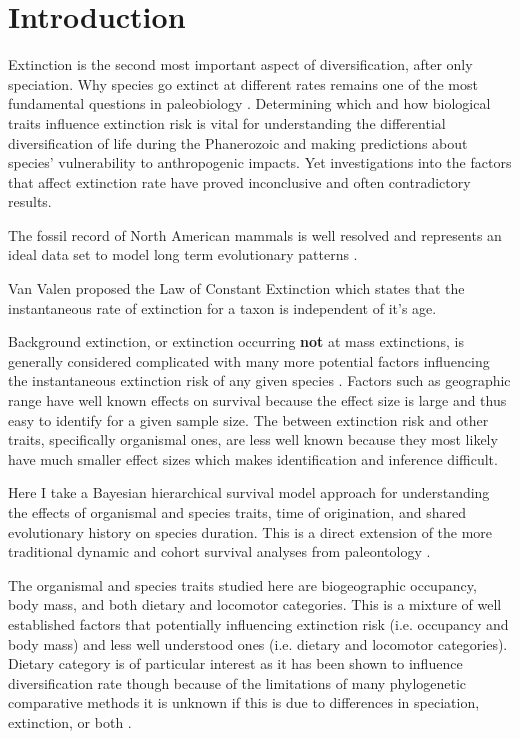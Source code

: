 \documentclass[12pt,letterpaper]{article}
\begin{document}
\section{Introduction}

Extinction is the second most important aspect of diversification, after only speciation. Why species go extinct at different rates remains one of the most fundamental questions in paleobiology \citep{Simpson1944,VanValen1973,Raup1991b,Raup1994,Quental2013,Wagner2014b,Jablonski2005,Payne2007,Kitchell1986}. Determining which and how biological traits influence extinction risk is vital for understanding the differential diversification of life during the Phanerozoic and making predictions about species' vulnerability to anthropogenic impacts. Yet investigations into the factors that affect extinction rate have proved inconclusive and often contradictory results.


The fossil record of North American mammals is well resolved and represents an ideal data set to model long term evolutionary patterns \citep{Quental2013,Alroy2009,Alroy1996a,Alroy1998,Alroy2000g,Simpson1944,Blois2009,Tomiya2013,Marcot2014}.

Van Valen proposed the Law of Constant Extinction \citep{VanValen1973} which states that the instantaneous rate of extinction for a taxon is independent of it's age. 

Background extinction, or extinction occurring \textbf{not} at mass extinctions, is generally considered complicated with many more potential factors influencing the instantaneous extinction risk of any given species \citep{Jablonski1986,Wang2003,Harnik2013,Kitchell1986,Nurnberg2013a,Payne2007}. Factors such as geographic range have well known effects on survival \citep{Payne2007,Jablonski1987} because the effect size is large and thus easy to identify for a given sample size. The between extinction risk and other traits, specifically organismal ones, are less well known because they most likely have much smaller effect sizes which makes identification and inference difficult.

Here I take a Bayesian hierarchical survival model approach for understanding the effects of organismal and species traits, time of origination, and shared evolutionary history on species duration. This is a direct extension of the more traditional dynamic and cohort survival analyses from paleontology \citep{Simpson1944,VanValen1973,Foote1988,Raup1978,Raup1975,VanValen1979,Baumiller1993,Sepkoski1975}.

The organismal and species traits studied here are biogeographic occupancy, body mass, and both dietary and locomotor categories. This is a mixture of well established factors that potentially influencing extinction risk (i.e. occupancy and body mass) and less well understood ones (i.e. dietary and locomotor categories). Dietary category is of particular interest as it has been shown to influence diversification rate \citep{Price2012} though because of the limitations of many phylogenetic comparative methods it is unknown if this is due to differences in speciation, extinction, or both \citep{Rabosky2010a}.

\end{document}

